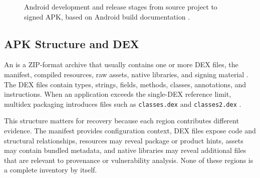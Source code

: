 \begin{figure}[H]
\centering
{}
\caption{Android development and release stages from source project to signed APK, based on Android build documentation \cite{androidBuildOverview,androidD8,androidShrinkCode}.}
\label{fig:master-android-build-stages}
\end{figure}

\subsection{APK Structure and DEX}

An \APK is a ZIP-format archive that usually contains one or more DEX files,
the manifest, compiled resources, raw assets, native libraries, and signing
material \cite{androidApkAnalyzer}. The DEX files contain types, strings,
fields, methods, classes, annotations, and instructions. When an application
exceeds the single-DEX reference limit, multidex packaging introduces files
such as \texttt{classes.dex} and \texttt{classes2.dex}
\cite{androidMultidex}.

This structure matters for recovery because each region contributes different
evidence. The manifest provides configuration context, DEX files expose code
and structural relationships, resources may reveal package or product hints,
assets may contain bundled metadata, and native libraries may reveal
additional files that are relevant to provenance or vulnerability analysis.
None of these regions is a complete inventory by itself.

